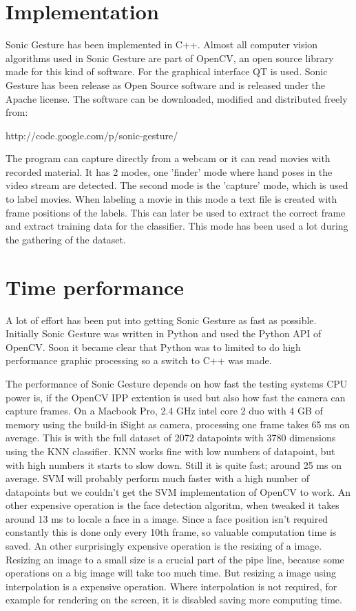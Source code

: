 \section{Implementation}
Sonic Gesture has been implemented in C++. Almost all computer vision algorithms used in Sonic Gesture are part of OpenCV, an open source library made for this kind of software. For the graphical interface QT is used. Sonic Gesture has been release as Open Source software and is released under the Apache license. The software can be downloaded, modified and distributed freely from:

http://code.google.com/p/sonic-gesture/

The program can capture directly from a webcam or it can read movies with recorded material. It has 2 modes, one 'finder' mode where hand poses in the video stream are detected. The second mode is the 'capture' mode, which is used to label movies. When labeling a movie in this mode a text file is created with frame positions of the labels. This can later be used to extract the correct frame and extract training data for the classifier. This mode has been used a lot during the gathering of the dataset.

\section{Time performance}
A lot of effort has been put into getting Sonic Gesture as fast as possible. Initially Sonic Gesture was written in Python and used the Python API of OpenCV. Soon it became clear that Python was to limited to do high performance graphic processing so a switch to C++ was made. 

The performance of Sonic Gesture depends on how fast the testing systems CPU power is, if the OpenCV IPP extention is used but also how fast the camera can capture frames. On a Macbook Pro, 2.4 GHz intel core 2 duo with 4 GB of memory using the build-in iSight as camera, processing one frame takes 65 ms on average. This is with the full dataset of 2072 datapoints with 3780 dimensions using the KNN classifier. KNN works fine with low numbers of datapoint, but with high numbers it starts to slow down. Still it is quite fast; around 25 ms on average. SVM will probably perform much faster with a high number of datapoints but we couldn't get the SVM implementation of OpenCV to work. An other expensive operation is the face detection algoritm, when tweaked it takes around 13 ms to locale a face in a image. Since a face position isn't required constantly this is done only every 10th frame, so valuable computation time is saved. An other surprisingly expensive operation is the resizing of a image. Resizing an image to a small size is a crucial part of the pipe line, because some operations on a big image will take too much time. But resizing a image using interpolation is a expensive operation. Where interpolation is not required, for example for rendering on the screen, it is disabled saving more computing time. 

